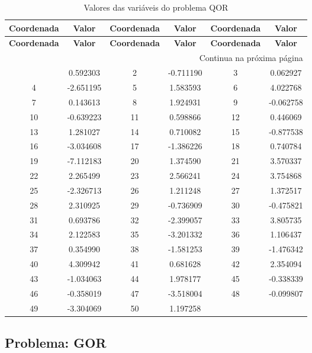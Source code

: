 \documentclass[12pt]{article}
\begin{document}
\small
\begin{longtable}{@{}cc|cc|cc@{}}
\caption{Valores das variáveis do problema QOR} \\
\toprule
\textbf{Coordenada} & \textbf{Valor} & \textbf{Coordenada} & \textbf{Valor} & \textbf{Coordenada} & \textbf{Valor} \\
\midrule
\endfirsthead

\toprule
\textbf{Coordenada} & \textbf{Valor} & \textbf{Coordenada} & \textbf{Valor} & \textbf{Coordenada} & \textbf{Valor} \\
\midrule
\endhead

\midrule \multicolumn{6}{r}{{Continua na próxima página}} \\ \midrule
\endfoot

\bottomrule
\endlastfoot
1 & 0.592303 & 2 & -0.711190 & 3 & 0.062927 \\
4 & -2.651195 & 5 & 1.583593 & 6 & 4.022768 \\
7 & 0.143613 & 8 & 1.924931 & 9 & -0.062758 \\
10 & -0.639223 & 11 & 0.598866 & 12 & 0.446069 \\
13 & 1.281027 & 14 & 0.710082 & 15 & -0.877538 \\
16 & -3.034608 & 17 & -1.386226 & 18 & 0.740784 \\
19 & -7.112183 & 20 & 1.374590 & 21 & 3.570337 \\
22 & 2.265499 & 23 & 2.566241 & 24 & 3.754868 \\
25 & -2.326713 & 26 & 1.211248 & 27 & 1.372517 \\
28 & 2.310925 & 29 & -0.736909 & 30 & -0.475821 \\
31 & 0.693786 & 32 & -2.399057 & 33 & 3.805735 \\
34 & 2.122583 & 35 & -3.201332 & 36 & 1.106437 \\
37 & 0.354990 & 38 & -1.581253 & 39 & -1.476342 \\
40 & 4.309942 & 41 & 0.681628 & 42 & 2.354094 \\
43 & -1.034063 & 44 & 1.978177 & 45 & -0.338339 \\
46 & -0.358019 & 47 & -3.518004 & 48 & -0.099807 \\
49 & -3.304069 & 50 & 1.197258 &  &  \\

\end{longtable}


\newpage            
\subsection{Problema: GOR}
\end{document}
